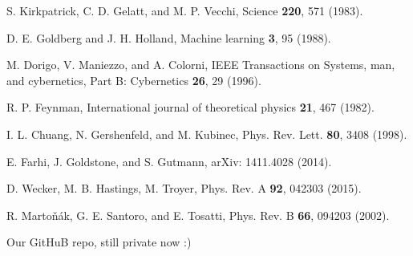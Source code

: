 \documentclass[aps,pra,twocolumn,superscriptaddress]{revtex4-2}
\begin{document}
\begin{thebibliography}{99}
 S. Kirkpatrick, C. D. Gelatt, and M. P. Vecchi, Science {\bf 220}, 571 (1983).

 D. E. Goldberg and J. H. Holland, Machine learning {\bf 3}, 95 (1988).

 M. Dorigo, V. Maniezzo, and A. Colorni, IEEE Transactions on Systems, man, and cybernetics, Part B: Cybernetics {\bf 26}, 29 (1996).

 R. P. Feynman, International journal of theoretical physics \textbf{21}, 467 (1982).

 I. L. Chuang, N. Gershenfeld, and M. Kubinec, Phys. Rev. Lett. \textbf{80}, 3408 (1998).

 E. Farhi, J. Goldstone, and S. Gutmann, arXiv: 1411.4028 (2014).

 D. Wecker, M. B. Hastings, M. Troyer, Phys. Rev. A \textbf{92}, 042303 (2015).

 R. Marto\v{n}\'ak, G. E. Santoro, and E. Tosatti, Phys. Rev. B \textbf{66}, 094203 (2002).

Our GitHuB repo, still private now :)
\end{thebibliography}

\appendix
\end{document}
